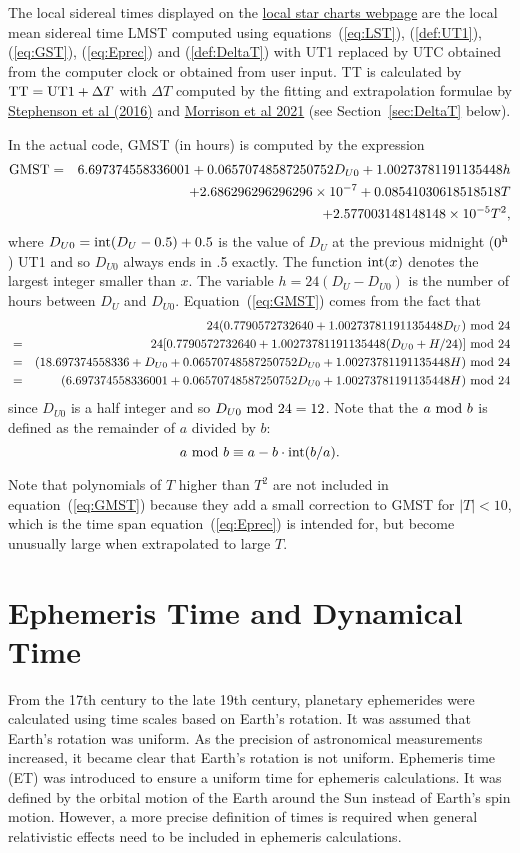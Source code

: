 \documentclass[12pt]{article}
\newcommand \beq {\begin{equation}}
\newcommand \eeq {\end{equation}}
\newcommand \beqn {\begin{eqnarray}}
\newcommand \eeqn {\end{eqnarray}}
\begin{document}
The local sidereal 
times displayed on the \href{../sidereal.html}{local star charts webpage} are the 
local mean sidereal time LMST computed using equations~(\ref{eq:LST}), (\ref{def:UT1}), 
(\ref{eq:GST}), (\ref{eq:Eprec}) and (\ref{def:DeltaT}) with UT1 replaced by UTC 
obtained from the computer clock or obtained from user input. 
TT is calculated by ${\rm TT = UT1}+\Delta T$ 
with $\Delta T$ computed by the fitting and extrapolation formulae by 
\href{https://royalsocietypublishing.org/doi/10.1098/rspa.2016.0404}{Stephenson et al (2016)} 
and \href{https://royalsocietypublishing.org/doi/10.1098/rspa.2020.0776}{Morrison et al 2021} 
(see Section~\ref{sec:DeltaT} below).

In the actual code, GMST (in hours) is computed by the expression 
\beqn
  {\rm GMST} &=& 6.697374558336001 + 0.06570748587250752 D_{U0} 
+ 1.00273781191135448 h \cr 
&& + 2.686296296296296\times 10^{-7} + 0.08541030618518518 T \cr 
&& + 2.577003148148148\times 10^{-5} T^2 ,
\label{eq:GMST}
\eeqn
where $D_{U0} = {\rm int}(D_U - 0.5) + 0.5$ is the value of $D_U$ at the previous 
midnight ($0^{\rm h}$) UT1 and so $D_{U0}$ always ends in .5 exactly. The function 
${\rm int}(x)$ denotes the largest integer smaller than $x$. The variable 
$h=24(D_U-D_{U0})$ 
is the number of hours between $D_U$ and $D_{U0}$. Equation~(\ref{eq:GMST}) comes 
from the fact that
\beqn
  && 24(0.7790572732640 + 1.00273781191135448 D_U)~{\rm mod}~24 \cr
&=& 24[0.7790572732640 + 1.00273781191135448 (D_{U0}+H/24)]~{\rm mod}~24 \cr
&=& (18.697374558336 + D_{U0} + 0.06570748587250752 D_{U0} + 
1.00273781191135448 H)~{\rm mod}~24 \cr
&=& (6.697374558336001 + 0.06570748587250752 D_{U0} + 
1.00273781191135448 H)~{\rm mod}~24 
\eeqn
since $D_{U0}$ is a half integer and so $D_{U0}~{\rm mod}~24=12$. Note that 
the $a~{\rm mod}~b$ is defined as the remainder of $a$ divided by $b$:
\beq
  a~{\rm mod}~b \equiv a - b \cdot {\rm int}(b/a) .
\eeq

Note that polynomials of $T$ higher than $T^2$ are not included in 
equation~(\ref{eq:GMST}) because they add a small correction to 
GMST for $|T|<10$, which is the time span equation~(\ref{eq:Eprec}) is intended for, 
but become unusually large when extrapolated to large $T$.

\section{Ephemeris Time and Dynamical Time}
\label{sec:ET}

From the 17th century to the late 19th century, planetary ephemerides 
were calculated using time scales based on Earth's rotation. It was 
assumed that Earth's rotation was uniform. As the precision of astronomical 
measurements increased, it became clear that Earth's rotation is not uniform. 
Ephemeris time (ET) was introduced to ensure a uniform time for ephemeris calculations.
It was defined by the orbital motion of the Earth 
around the Sun instead of Earth's spin motion. However, a more precise 
definition of times is required when general relativistic effects need to be included 
in ephemeris calculations.
\end{document}
